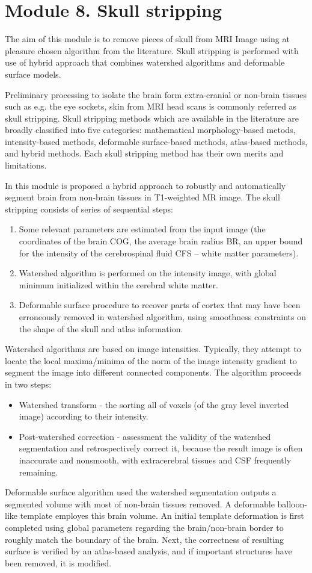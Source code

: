 \section{Module 8. Skull stripping}

The aim of this module is to remove pieces of skull from MRI Image
using at pleasure chosen algorithm from the literature. Skull stripping
is performed with use of hybrid approach that combines watershed algorithms
and deformable surface models.

Preliminary processing to isolate the brain form extra-cranial or
non-brain tissues such as e.g. the eye sockets, skin from MRI head
scans is commonly referred as skull stripping. Skull stripping methods
which are available in the literature are broadly classified into
five categories: mathematical morphology-based metods, intensity-based
methods, deformable surface-based methods, atlas-based methods, and
hybrid methods. Each skull stripping method has their own merits and
limitations.

In this module is proposed a hybrid approach to robustly and automatically
segment brain from non-brain tissues in T1-weighted MR image. The
skull stripping consists of series of sequential steps:
\begin{enumerate}
\item {Some relevant parameters are estimated from the input image (the
coordinates of the brain COG, the average brain radius BR, an upper
bound for the intensity of the cerebrospinal fluid CFS – white matter
parameters).} 
\item {Watershed algorithm is performed on the intensity image, with global
minimum initialized within the cerebral white matter.} 
\item {Deformable surface procedure to recover parts of cortex that may
have been erroneously removed in watershed algorithm, using smoothness
constraints on the shape of the skull and atlas information.} 
\end{enumerate}
Watershed algorithms are based on image intensities. Typically, they
attempt to locate the local maxima/minima of the norm of the image
intensity gradient to segment the image into different connected components.
The algorithm proceeds in two steps:
\begin{itemize}
\item {Watershed transform - the sorting all of voxels (of the gray level
inverted image) according to their intensity.} 
\item {Post-watershed correction - assessment the validity of the watershed
segmentation and retrospectively correct it, because the result image
is often inaccurate and nonsmooth, with extracerebral tissues and
CSF frequently remaining.} 
\end{itemize}
Deformable surface algorithm used the watershed segmentation outputs
a segmented volume with most of non-brain tissues removed. A deformable
balloon-like template employes this brain volume. An initial template
deformation is first completed using global parameters regarding the
brain/non-brain border to roughly match the boundary of the brain.
Next, the correctness of resulting surface is verified by an atlas-based
analysis, and if important structures have been removed, it is modified.